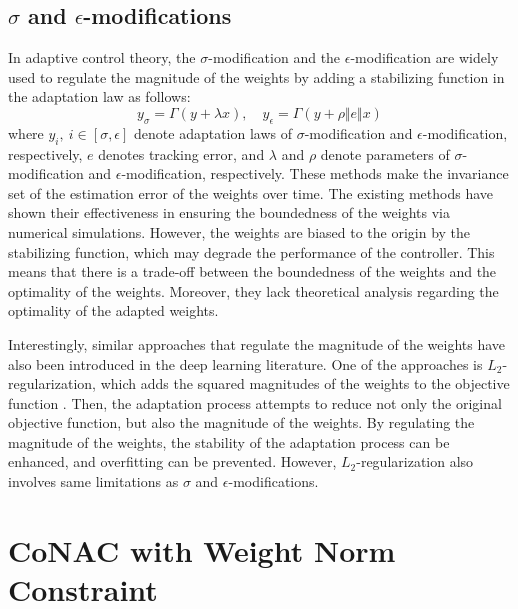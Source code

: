 \subsection{
    \texorpdfstring{$\sigma$}{σ} and \texorpdfstring{$\epsilon$}{ε}-modifications
} 

In adaptive control theory, the $\sigma$-modification \cite{RN19} and the $\epsilon$-modification \cite{RN18, RN46} are widely used to regulate the magnitude of the weights by adding a stabilizing function in the adaptation law as follows:
\begin{equation}
    y_\sigma = \Gamma (y+\lambda x)
    ,
    \quad
    y_\epsilon = \Gamma (y+\rho\Vert e\Vert x)
\end{equation}
where $y_i,\ i\in[\sigma,\epsilon]$ denote adaptation laws of $\sigma$-modification and $\epsilon$-modification, respectively, $e$ denotes tracking error, and $\lambda$ and $\rho$ denote parameters of $\sigma$-modification and $\epsilon$-modification, respectively.
These methods make the invariance set of the estimation error of the weights over time.
The existing methods have shown their effectiveness in ensuring the boundedness of the weights via numerical simulations.
However, the weights are biased to the origin by the stabilizing function, which may degrade the performance of the controller.
This means that there is a trade-off between the boundedness of the weights and the optimality of the weights.
Moreover, they lack theoretical analysis regarding the optimality of the adapted weights.

Interestingly, similar approaches that regulate the magnitude of the weights have also been introduced in the deep learning literature.
One of the approaches is $L_2$-regularization, which adds the squared magnitudes of the weights to the objective function \cite{RN34, RN36}.
Then, the adaptation process attempts to reduce not only the original objective function, but also the magnitude of the weights.
By regulating the magnitude of the weights, the stability of the adaptation process can be enhanced, and overfitting can be prevented.
However, $L_2$-regularization also involves same limitations as $\sigma$ and $\epsilon$-modifications.

\section{CoNAC with Weight Norm Constraint} \label{chap3:problem} 


